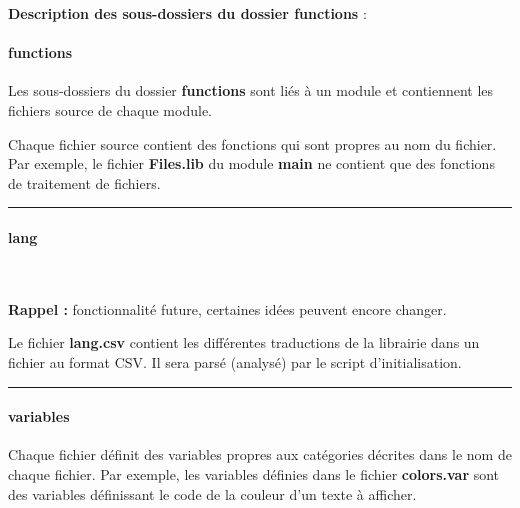 \documentclass[a4paper,10pt]{article}
\begin{document}
\textbf{Description des sous-dossiers du dossier \textbf{functions}} :

\setcounter{secnumdepth}{4}
\paragraph{functions}\mbox{}

\begin{justify}
    Les sous-dossiers du dossier \textbf{functions} sont liés à un module et contiennent les fichiers source de chaque module.
\end{justify}

\begin{justify}
    Chaque fichier source contient des fonctions qui sont propres au nom du fichier. Par exemple, le fichier \textbf{\color{lime}Files.lib} du module \textbf{main} ne contient que des fonctions de traitement de fichiers.
\end{justify}


\par\noindent\rule{\textwidth}{0.4pt}

\paragraph{lang}\mbox{}\\\mbox{}

\textbf{Rappel :} fonctionnalité future, certaines idées peuvent encore changer.

\begin{justify}
    Le fichier \textbf{\color{lime}lang.csv} contient les différentes traductions de la librairie dans un fichier au format CSV. Il sera parsé (analysé) par le script d'initialisation.
\end{justify}


\par\noindent\rule{\textwidth}{0.4pt}

\paragraph{variables}\mbox{}

\begin{justify}
    Chaque fichier définit des variables propres aux catégories décrites dans le nom de chaque fichier. Par exemple, les variables définies dans le fichier \textbf{\color{lime}colors.var} sont des variables définissant le code de la couleur d'un texte à afficher.
\end{justify}
\end{document}
